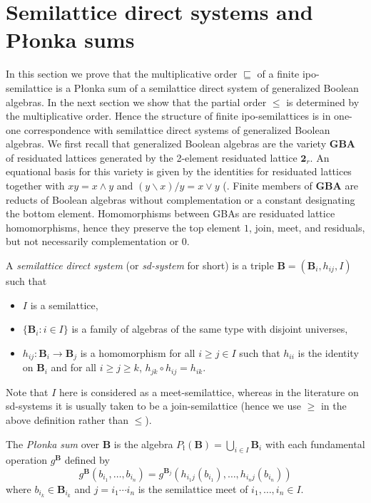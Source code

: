 \documentclass[12pt]{amsart}
\newcommand{\m}{\mathbf} %
\newcommand{\rd}{{/}}
\newcommand{\ld}{{\backslash}}
\begin{document}
\section{Semilattice direct systems and P\l onka sums}
In this section we prove that the multiplicative order $\sqsubseteq$ of a finite ipo-semilattice is a
P\l onka sum of
a semilattice direct system of generalized Boolean algebras. In the next section we show that
the partial order $\le$ is determined by the multiplicative order. Hence the structure
of finite ipo-semilattices is in one-one correspondence with semilattice direct systems of
generalized Boolean algebras. We first recall that generalized Boolean algebras are the variety \textbf{GBA}
of residuated lattices generated by the 2-element residuated lattice $\m 2_r$. An equational basis
for this variety is given by the identities for residuated lattices together with $xy=x\wedge y$ and
$(y\ld x)\rd y=x\vee y$ (\cite[Prop. 3.23]{GJKO2007}. Finite members of \textbf{GBA} are
reducts of Boolean algebras without complementation or a constant designating the bottom element. Homomorphisms between GBAs are residuated lattice homomorphisms, hence they
preserve the top element $1$, join, meet, and residuals, but not necessarily complementation or $0$.

A \emph{semilattice direct system} (or \emph{sd-system} for short) is a triple $\m B=(\m B_i,h_{ij},I)$ such that
\begin{itemize}
\item $I$ is a semilattice,
\item $\{\m B_i:i\in I\}$ is a family of algebras of the same type with disjoint universes,%
\item $h_{ij}:\m B_i\to\m B_j$ is a homomorphism for all $i\ge j\in I$ such that $h_{ii}$ is the identity on $\m B_i$ and for all $i\ge j\ge k$, $h_{jk}\circ h_{ij}=h_{ik}$.
\end{itemize}

Note that $I$ here is considered as a meet-semilattice, whereas in the literature on sd-systems it is usually taken to be a join-semilattice (hence we use $\ge$ in the above definition rather than $\le$).

The \emph{P\l onka sum} over $\m B$ is the algebra $P_\text{\l}(\m B)=\bigcup_{i\in I}\m B_i$ with each fundamental operation $g^\m B$ defined by
$$g^\m B(b_{i_1},\dots,b_{i_n})=g^{\m B_j}(h_{i_1j}(b_{i_1}),\dots,h_{i_nj}(b_{i_n}))$$
where $b_{i_k}\in \m B_{i_k}$ and $j=i_1\cdots i_n$ is the semilattice meet of $i_1,\dots, i_n\in I$.
\end{document}
